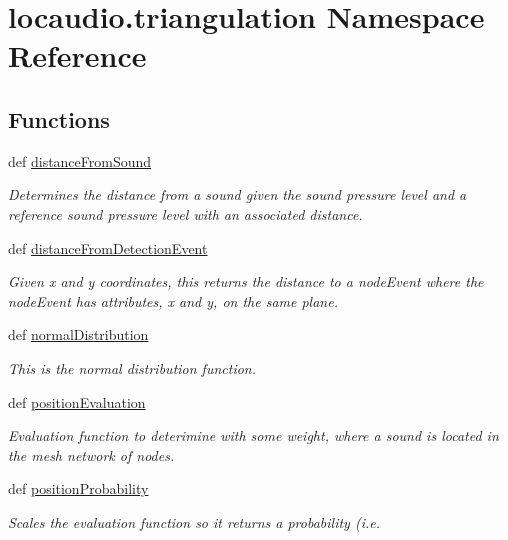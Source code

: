 \hypertarget{namespacelocaudio_1_1triangulation}{\section{locaudio.\-triangulation Namespace Reference}
\label{namespacelocaudio_1_1triangulation}
}
\subsection*{Functions}
\begin{DoxyCompactItemize}
\item 
def \hyperlink{namespacelocaudio_1_1triangulation_a4a7017521badc87c46d0b84774d70b2f}{distance\-From\-Sound}
\begin{DoxyCompactList}\small\item\em Determines the distance from a sound given the sound pressure level and a reference sound pressure level with an associated distance. \end{DoxyCompactList}\item 
def \hyperlink{namespacelocaudio_1_1triangulation_ac52a12426ddad7f84fd8fdce6d53a7e0}{distance\-From\-Detection\-Event}
\begin{DoxyCompactList}\small\item\em Given x and y coordinates, this returns the distance to a node\-Event where the node\-Event has attributes, x and y, on the same plane. \end{DoxyCompactList}\item 
def \hyperlink{namespacelocaudio_1_1triangulation_aeda79115af2a41e618d834fe29a63104}{normal\-Distribution}
\begin{DoxyCompactList}\small\item\em This is the normal distribution function. \end{DoxyCompactList}\item 
def \hyperlink{namespacelocaudio_1_1triangulation_af600bbadd299c94825b159b5df236f6f}{position\-Evaluation}
\begin{DoxyCompactList}\small\item\em Evaluation function to deterimine with some weight, where a sound is located in the mesh network of nodes. \end{DoxyCompactList}\item 
def \hyperlink{namespacelocaudio_1_1triangulation_af708227f069b847392f730d13060cce8}{position\-Probability}
\begin{DoxyCompactList}\small\item\em Scales the evaluation function so it returns a probability (i.\-e. \end{DoxyCompactList}\end{DoxyCompactItemize}
